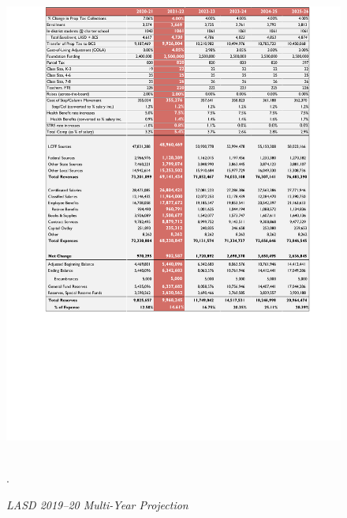 \begin{figure}[!t]
  \centering
  \caption[LASD 2019–20 Multi-Year Projection]{\textit{LASD 2019–20 Multi-Year Projection}}%
  \label{fig:multi-year-proj}
  \includegraphics[width=\textwidth]{LASD_Multi_Year_Projection}\
  \footnotesize\raggedright\textcite[137]{Kenyon2021a}.
\end{figure}\bigskip%


